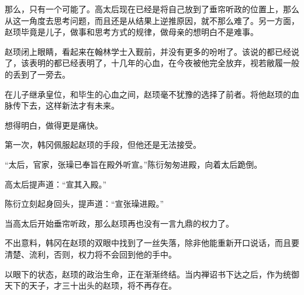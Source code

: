 那么，只有一个可能了。高太后现在已经是将自己放到了垂帘听政的位置上，那么从这一角度去思考问题，而且还是从结果上逆推原因，就不那么难了。另一方面，赵顼毕竟是儿子，做事和思考方式的规律，做母亲的想明白不是难事。

赵顼闭上眼睛，看起来在翰林学士入觐前，并没有更多的吩咐了。该说的都已经说了，该表明的都已经表明了，十几年的心血，在今夜被他完全放弃，视若敝履一般的丢到了一旁去。

在儿子继承皇位，和毕生的心血之间，赵顼毫不犹豫的选择了前者。将他赵顼的血脉传下去，这样新法才有未来。

想得明白，做得更是痛快。

第一次，韩冈佩服起赵顼的手段，但他还是无法接受。

“太后，官家，张璪已奉旨在殿外听宣。”陈衍匆匆进殿，向着太后跪倒。

高太后提声道：“宣其入殿。”

陈衍立刻起身回头，提声道：“宣张璪进殿。”

当高太后开始垂帘听政，那么赵顼再也没有一言九鼎的权力了。

不出意料，韩冈在赵顼的双眼中找到了一丝失落，除非他能重新开口说话，而且要清楚、流利，否则，权力将不会回到他的手中。

以眼下的状态，赵顼的政治生命，正在渐渐终结。当内禅诏书下达之后，作为统御天下的天子，才三十出头的赵顼，将不再存在。

